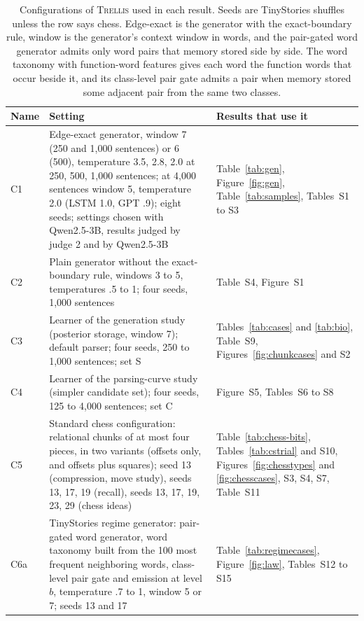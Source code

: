\documentclass[11pt,letterpaper]{article}
\newcommand{\trellis}{\textsc{Trellis}}
\begin{document}
\begin{table}[h]
\caption{Configurations of \trellis{} used in each result. Seeds are TinyStories shuffles unless the row says chess. Edge-exact is the generator with the exact-boundary rule, window is the generator's context window in words, and the pair-gated word generator admits only word pairs that memory stored side by side.
The word taxonomy with function-word features gives each word the function words that occur beside it, and its class-level pair gate admits a pair when memory stored some adjacent pair from the same two classes.}
\label{tab:config}
\begin{center}
\scriptsize
\begin{tabular}{p{}p{}p{}}
\toprule
Name & Setting & Results that use it \\
\midrule
C1 & Edge-exact generator, window 7 (250 and 1,000 sentences) or 6 (500), temperature 3.5, 2.8, 2.0 at 250, 500, 1,000 sentences; at 4,000 sentences window 5, temperature 2.0 (LSTM 1.0, GPT .9); eight seeds; settings chosen with Qwen2.5-3B, results judged by judge 2 and by Qwen2.5-3B & Table~\ref{tab:gen}, Figure~\ref{fig:gen}, Table~\ref{tab:samples}, Tables~S1 to S3 \\
C2 & Plain generator without the exact-boundary rule, windows 3 to 5, temperatures .5 to 1; four seeds, 1,000 sentences & Table~S4, Figure~S1 \\
C3 & Learner of the generation study (posterior storage, window 7); default parser; four seeds, 250 to 1,000 sentences; set S & Tables~\ref{tab:cases} and \ref{tab:bio}, Table~S9, Figures~\ref{fig:chunkcases} and S2 \\
C4 & Learner of the parsing-curve study (simpler candidate set); four seeds, 125 to 4,000 sentences; set C & Figure~S5, Tables~S6 to S8 \\
C5 & Standard chess configuration: relational chunks of at most four pieces, in two variants (offsets only, and offsets plus squares); seed 13 (compression, move study), seeds 13, 17, 19 (recall), seeds 13, 17, 19, 23, 29 (chess ideas) & Table~\ref{tab:chess-bits}, Tables~\ref{tab:cstrial} and S10, Figures~\ref{fig:chesstypes} and \ref{fig:chesscases}, S3, S4, S7, Table~S11 \\
C6a & TinyStories regime generator: pair-gated word generator, word taxonomy built from the 100 most frequent neighboring words, class-level pair gate and emission at level $b$, temperature .7 to 1, window 5 or 7; seeds 13 and 17 & Table~\ref{tab:regimecases}, Figure~\ref{fig:law}, Tables~S12 to S15 \\

\end{tabular}
\end{center}
\end{table}
\end{document}
